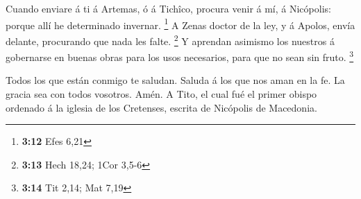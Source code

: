  Cuando enviare á ti á Artemas, ó á Tichîco, procura
venir á mí, á Nicópolis: porque allí he determinado invernar.
\footnote{\textbf{3:12} Efes 6,21}  A Zenas doctor de la
ley, y á Apolos, envía delante, procurando que nada les falte.
\footnote{\textbf{3:13} Hech 18,24; 1Cor 3,5-6}  Y
aprendan asimismo los nuestros á gobernarse en buenas obras para los
usos necesarios, para que no sean sin fruto. \footnote{\textbf{3:14} Tit
  2,14; Mat 7,19}

 Todos los que están conmigo te saludan. Saluda á los que
nos aman en la fe. La gracia sea con todos vosotros. Amén. A Tito, el
cual fué el primer obispo ordenado á la iglesia de los Cretenses,
escrita de Nicópolis de Macedonia.
